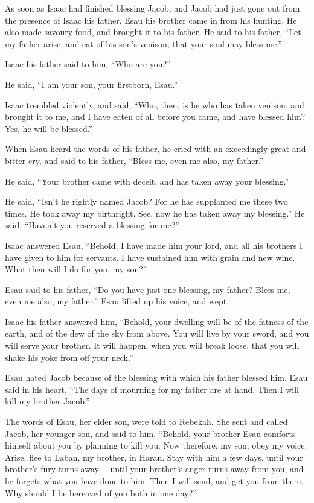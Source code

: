  As soon as Isaac had finished blessing Jacob, and Jacob
had just gone out from the presence of Isaac his father, Esau his
brother came in from his hunting.  He also made savoury
food, and brought it to his father. He said to his father, ``Let my
father arise, and eat of his son's venison, that your soul may bless
me.''

 Isaac his father said to him, ``Who are you?''

He said, ``I am your son, your firstborn, Esau.''

 Isaac trembled violently, and said, ``Who, then, is he who
has taken venison, and brought it to me, and I have eaten of all before
you came, and have blessed him? Yes, he will be blessed.''

 When Esau heard the words of his father, he cried with an
exceedingly great and bitter cry, and said to his father, ``Bless me,
even me also, my father.''

 He said, ``Your brother came with deceit, and has taken
away your blessing.''

 He said, ``Isn't he rightly named Jacob? For he has
supplanted me these two times. He took away my birthright. See, now he
has taken away my blessing.'' He said, ``Haven't you reserved a blessing
for me?''

 Isaac answered Esau, ``Behold, I have made him your lord,
and all his brothers I have given to him for servants. I have sustained
him with grain and new wine. What then will I do for you, my son?''

 Esau said to his father, ``Do you have just one blessing,
my father? Bless me, even me also, my father.'' Esau lifted up his
voice, and wept.

 Isaac his father answered him, ``Behold, your dwelling
will be of the fatness of the earth, and of the dew of the sky from
above.  You will live by your sword, and you will serve
your brother. It will happen, when you will break loose, that you will
shake his yoke from off your neck.''

 Esau hated Jacob because of the blessing with which his
father blessed him. Esau said in his heart, ``The days of mourning for
my father are at hand. Then I will kill my brother Jacob.''

 The words of Esau, her elder son, were told to Rebekah.
She sent and called Jacob, her younger son, and said to him, ``Behold,
your brother Esau comforts himself about you by planning to kill you.
 Now therefore, my son, obey my voice. Arise, flee to
Laban, my brother, in Haran.  Stay with him a few days,
until your brother's fury turns away---  until your
brother's anger turns away from you, and he forgets what you have done
to him. Then I will send, and get you from there. Why should I be
bereaved of you both in one day?''

